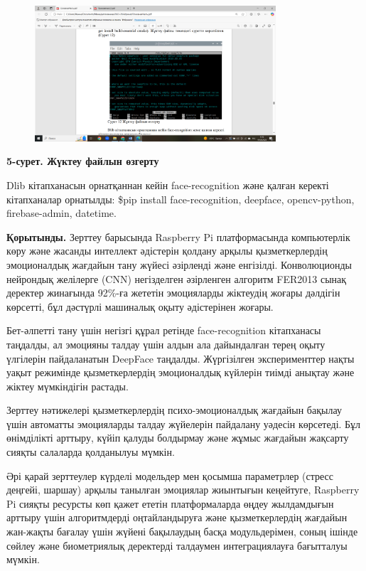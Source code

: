 \begin{figure}[H]
	\centering
	\includegraphics[width=0.8\textwidth]{media/ict2/image164}
	\caption*{}
\end{figure}


{\bfseries 5-сурет. Жүктеу файлын өзгерту}

Dlib кітапханасын орнатқаннан кейін face-recognition және қалған керекті
кітапханалар орнатылды: \$pip install face-recognition, deepface,
opencv-python, firebase-admin, datetime.

{\bfseries Қорытынды.} Зерттеу барысында Raspberry Pi платформасында
компьютерлік көру және жасанды интеллект әдістерін қолдану арқылы
қызметкерлердің эмоционалдық жағдайын тану жүйесі әзірленді және
енгізілді. Конволюционды нейрондық желілерге (CNN) негізделген
әзірленген алгоритм FER2013 сынақ деректер жинағында 92\%-ға жететін
эмоцияларды жіктеудің жоғары дәлдігін көрсетті, бұл дәстүрлі машиналық
оқыту әдістерінен жоғары.

Бет-әлпетті тану үшін негізгі құрал ретінде face-recognition кітапханасы
таңдалды, ал эмоцияны талдау үшін алдын ала дайындалған терең оқыту
үлгілерін пайдаланатын DeepFace таңдалды. Жүргізілген эксперименттер
нақты уақыт режимінде қызметкерлердің эмоционалдық күйлерін тиімді
анықтау және жіктеу мүмкіндігін растады.

Зерттеу нәтижелері қызметкерлердің психо-эмоционалдық жағдайын бақылау
үшін автоматты эмоцияларды талдау жүйелерін пайдалану уәдесін көрсетеді.
Бұл өнімділікті арттыру, күйіп қалуды болдырмау және жұмыс жағдайын
жақсарту сияқты салаларда қолданылуы мүмкін.

Әрі қарай зерттеулер күрделі модельдер мен қосымша параметрлер (стресс
деңгейі, шаршау) арқылы танылған эмоциялар жиынтығын кеңейтуге,
Raspberry Pi сияқты ресурсты көп қажет ететін платформаларда өңдеу
жылдамдығын арттыру үшін алгоритмдерді оңтайландыруға және
қызметкерлердің жағдайын жан-жақты бағалау үшін жүйені бақылаудың басқа
модульдерімен, соның ішінде сөйлеу және биометриялық деректерді
талдаумен интеграциялауға бағытталуы мүмкін.

